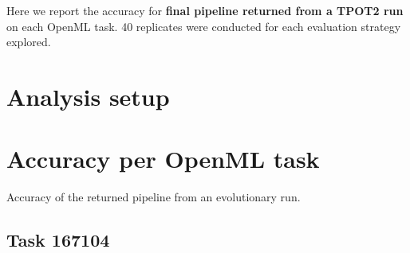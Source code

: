 \documentclass[
]{book}
\newenvironment{Shaded}{\begin{snugshade}}{\end{snugshade}}
\newcommand{\AttributeTok}[1]{\textcolor[rgb]{0.13,0.29,0.53}{#1}}
\newcommand{\ConstantTok}[1]{\textcolor[rgb]{0.56,0.35,0.01}{#1}}
\newcommand{\FunctionTok}[1]{\textcolor[rgb]{0.13,0.29,0.53}{\textbf{#1}}}
\newcommand{\NormalTok}[1]{#1}
\newcommand{\OtherTok}[1]{\textcolor[rgb]{0.56,0.35,0.01}{#1}}
\newcommand{\SpecialCharTok}[1]{\textcolor[rgb]{0.81,0.36,0.00}{\textbf{#1}}}
\newcommand{\StringTok}[1]{\textcolor[rgb]{0.31,0.60,0.02}{#1}}
\begin{document}
Here we report the accuracy for \textbf{final pipeline returned from a TPOT2 run} on each OpenML task.
40 replicates were conducted for each evaluation strategy explored.

\hypertarget{analysis-setup}{%
\section{Analysis setup}\label{analysis-setup}}

\begin{Shaded}
\end{Shaded}

\hypertarget{accuracy-per-openml-task}{%
\section{Accuracy per OpenML task}\label{accuracy-per-openml-task}}

Accuracy of the returned pipeline from an evolutionary run.

\hypertarget{task-167104}{%
\subsection{Task 167104}\label{task-167104}}
\end{document}

